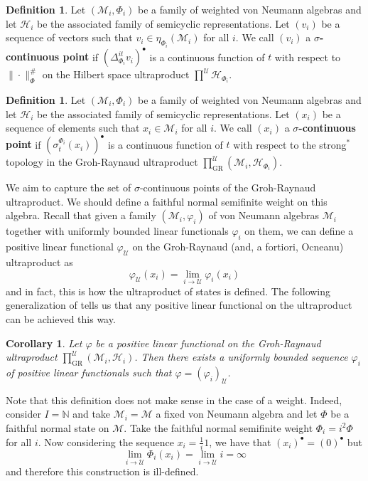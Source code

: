 \documentclass[12pt]{amsart}
\newtheorem{cor}[thm]{Corollary}
\theoremstyle{definition}
\newtheorem{defn}[thm]{Definition}
\def\cal{\mathcal}
\newcommand\cU{{\cal U}}
\def \GR{\operatorname{GR}}
\def \bbN{\mathbb{N}}
\begin{document}
\begin{defn}
    Let $(\cal M_i, \Phi_i)$ be a family of weighted von Neumann algebras and let $\cal H_i$ be the associated family of semicyclic representations.  Let $(v_i)$ be a sequence of vectors such that $v_i \in \eta_{\Phi_i}(\cal M_i)$ for all $i$.  We call $(v_i)$  a \textbf{$\sigma$-continuous point} if $(\Delta^{it}_{\Phi_i}v_i)^\bullet$ is a continuous function of $t$ with respect to $\|\cdot\|_{\Phi}^\#$ on the Hilbert space ultraproduct $\prod^{\cU} \cal H_{\Phi_i}$.
\end{defn}

\begin{defn}
    Let $(\cal M_i, \Phi_i)$ be a family of weighted von Neumann algebras and let $\cal H_i$ be the associated family of semicyclic representations.  Let $(x_i)$ be a sequence of elements such that $x_i \in \cal M_i$ for all $i$.  We call $(x_i)$  a \textbf{$\sigma$-continuous point} if $(\sigma_{t}^{\Phi_i}(x_i))^\bullet$ is a continuous function of $t$ with respect to the strong$^*$ topology in the Groh-Raynaud ultraproduct $\prod_{\GR}^{\cU} (\cal M_i, \cal H_{\Phi_i})$.
\end{defn}

We aim to capture the set of $\sigma$-continuous points of the Groh-Raynaud ultraproduct.  We should define a faithful normal semifinite weight on this algebra.  Recall that given a family $(\cal M_i, \varphi_i)$ of von Neumann algebras $\cal M_i$ together with uniformly bounded linear functionals $\varphi_i$ on them, we can define a positive linear functional $\varphi_{\cU}$ on the Groh-Raynaud (and, a fortiori, Ocneanu) ultraproduct as
\[
    \varphi_{\cU}(x_i) = \lim_{i \to \cU} \varphi_i(x_i)
\]
and in fact, this is how the ultraproduct of states is defined.  The following generalization of \cite[Corollary 3.25]{AH} tells us that any positive linear functional on the ultraproduct can be achieved this way.

\begin{cor}\label{functionalsOnGRCor}
    Let $\varphi$ be a positive linear functional on the Groh-Raynaud ultraproduct $\prod_{\GR}^{\cU} (\cal M_i, \cal H_i)$.  Then there exists a uniformly bounded sequence $\varphi_i$ of positive linear functionals such that $\varphi = (\varphi_i)_{\cU}$.
\end{cor}

Note that this definition does not make sense in the case of a weight.  Indeed, consider $I = \bbN$ and take $\cal M_i = \cal M$ a fixed von Neumann algebra and let $\Phi$ be a faithful normal state on $\cal M$.  Take the faithful normal semifinite weight $\Phi_i = i^2\Phi$ for all $i$.  Now considering the sequence $x_i = \frac{1}{i}1$, we have that $(x_i)^\bullet = (0)^\bullet$ but
\[
    \lim_{i \to \cU} \Phi_i(x_i) = \lim_{i \to \cU} i = \infty
\]
and therefore this construction is ill-defined.
\end{document}
